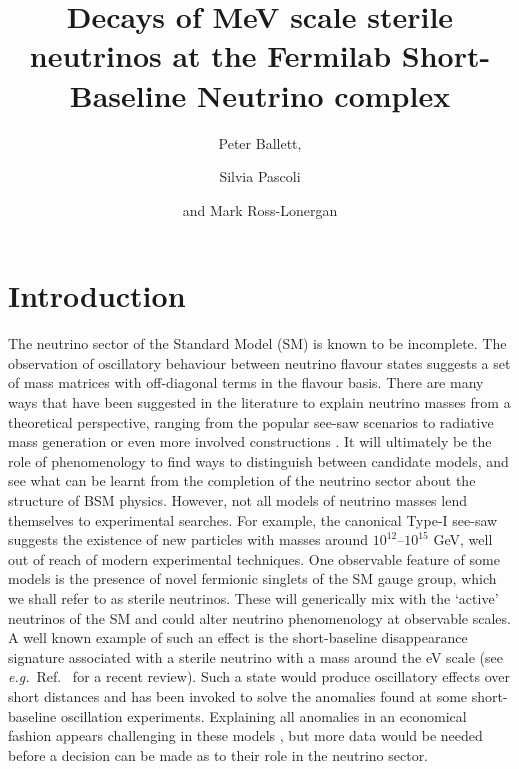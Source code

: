 \documentclass[11pt, a4paper]{article}
\title{Decays of MeV scale sterile neutrinos at the Fermilab Short-Baseline Neutrino complex}
\author{Peter Ballett,}
\author{Silvia Pascoli}
\author{and Mark Ross-Lonergan}
\affiliation{Institute for Particle Physics Phenomenology, Department of
Physics, Durham University, South Road, Durham DH1 3LE, United Kingdom}
\newcommand{\refref}[1]{Ref.~\cite{#1}}
\def\eg{\emph{e.g.}}
\begin{document}
 

\maketitle

\section{Introduction}

The neutrino sector of the Standard Model (SM) is known to be incomplete. The
observation of oscillatory behaviour between neutrino flavour states suggests a
set of mass matrices with off-diagonal terms in the flavour basis. There are
many ways that have been suggested in the literature to explain neutrino masses
from a theoretical perspective, ranging from the popular see-saw scenarios
\cite{Minkowski:1977sc, GellMann:1980vs, Mohapatra:1979ia} to radiative mass
generation \cite{XXX} or even more involved constructions \cite{XXX}. It will
ultimately be the role of phenomenology to find ways to distinguish between
candidate models, and see what can be learnt from the completion of the
neutrino sector about the structure of BSM physics.
%
However, not all models of neutrino masses lend themselves to experimental
searches. For example, the canonical Type-I see-saw \cite{Minkowski:1977sc,
GellMann:1980vs, Mohapatra:1979ia} suggests the existence of new particles with
masses around $10^{12}$--$10^{15}$ GeV, well out of reach of modern
experimental techniques.  One observable feature of some models is the presence
of novel fermionic singlets of the SM gauge group, which we shall refer to as
sterile neutrinos.  These will generically mix with the `active' neutrinos of
the SM and could alter neutrino phenomenology at observable scales. 
%
A well known example of such an effect is the short-baseline disappearance
signature associated with a sterile neutrino with a mass around the eV scale
(see \eg\ \refref{Gariazzo:2015rra} for a recent review). Such a state would
produce oscillatory effects over short distances and has been invoked to solve
the anomalies found at some short-baseline oscillation experiments.  Explaining
all anomalies in an economical fashion appears challenging in these models
\cite{Kopp:2013vaa}, but more data would be needed before a decision can be
made as to their role in the neutrino sector.
\end{document}
